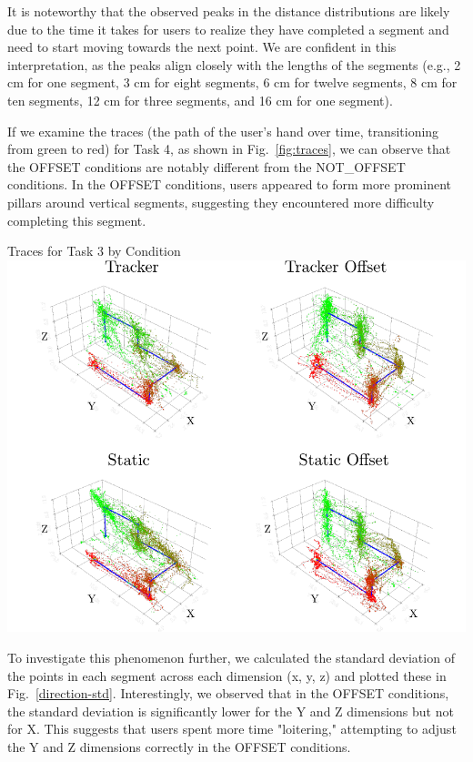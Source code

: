 It is noteworthy that the observed peaks in the distance distributions are likely due to the time it takes for users to realize they have completed a segment and need to start moving towards the next point. We are confident in this interpretation, as the peaks align closely with the lengths of the segments (e.g., 2 cm for one segment, 3 cm for eight segments, 6 cm for twelve segments, 8 cm for ten segments, 12 cm for three segments, and 16 cm for one segment).

If we examine the traces (the path of the user's hand over time, transitioning from green to red) for Task 4, as shown in Fig.~\ref{fig:traces}, we can observe that the OFFSET conditions are notably different from the NOT\_OFFSET conditions. In the OFFSET conditions, users appeared to form more prominent pillars around vertical segments, suggesting they encountered more difficulty completing this segment.

\begin{figureBox}[label={fig:traces}, width=0.8\linewidth]{Traces for Task 3 by Condition}
    \includegraphics[width=1.0\linewidth]{./evaluation/figures/task_3.pdf}
\end{figureBox}

To investigate this phenomenon further, we calculated the standard deviation of the points in each segment across each dimension (x, y, z) and plotted these in Fig.~\ref{direction-std}. Interestingly, we observed that in the OFFSET conditions, the standard deviation is significantly lower for the Y and Z dimensions but not for X. This suggests that users spent more time "loitering," attempting to adjust the Y and Z dimensions correctly in the OFFSET conditions.


